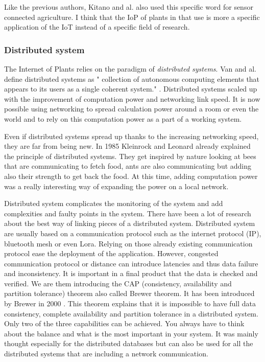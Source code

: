 Like the previous authors, Kitano and al. \cite{kitanoInternetPlantsIoP2022} also used 
this specific word for sensor connected agriculture. I think that the IoP of plants in 
that use is more a specific application of the IoT instead of a specific field of research.

\subsubsection{Distributed system}

The Internet of Plants relies on the paradigm of \textit{distributed systems}. Van and al. define
distributed systems as " collection of autonomous computing elements that appears to its users as a single coherent system."
\cite{steenDistributedSystems2017}. 
Distributed systems scaled up with the improvement of computation power and networking link speed.
It is now possible using networking to spread calculation power around a room or even the world and to
rely on this computation power as a part of a working system.

Even if distributed systems spread up thanks to the increasing networking speed, they are far
from being new.
In 1985 Kleinrock and Leonard \cite{kleinrockDistributedSystems} already
explained the principle of distributed systems. They get inspired by nature looking at bees that are communicating to fetch food,
ants are also communicating but adding also their strength to get back the food.
At this time, adding computation power was a really interesting way of expanding the power on a local network.

Distributed system complicates the monitoring of the system and add complexities and faulty points in the system.
There have been a lot of
research about the best way of linking pieces of a distributed system. Distributed system are usually based on a 
communication protocol such as the internet protocol (IP), bluetooth mesh or even Lora.
Relying on those already existing communication protocol ease the deployment of the application.
However, congested communication protocol or distance can introduce latencies and thus data failure and inconsistency.
It is important in a final product that the data is checked and verified.
We are them introducing the CAP (consistency, availability and partition tolerance) theorem also called Brewer theorem.
It has been introduced by Brewer in 2000 \cite{brewerRobustDistributedSystems2000}.
This theorem explains that it is impossible to have full data consistency, complete availability and partition tolerance
in a distributed system. Only two of the three capabilities can be achieved.
You always have to think about the balance and what is the most important in your system.
It was mainly thought especially for the distributed databases but can also be used for all the distributed systems that are
including a network communication.


